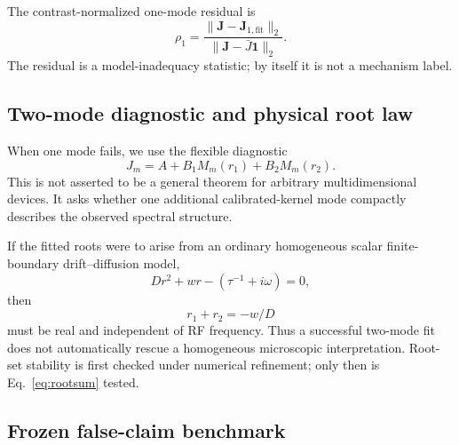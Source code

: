 \documentclass[11pt]{article}
\begin{document}
The contrast-normalized one-mode residual is
\begin{equation}
\rho_1=\frac{\|\bm J-\bm J_{1,\mathrm{fit}}\|_2}{\|\bm J-\bar J\bm 1\|_2}.
\label{eq:rho1}
\end{equation}
The residual is a model-inadequacy statistic; by itself it is not a mechanism label.

\subsection{Two-mode diagnostic and physical root law}

When one mode fails, we use the flexible diagnostic
\begin{equation}
J_m=A+B_1M_m(r_1)+B_2M_m(r_2).
\label{eq:twomode}
\end{equation}
This is not asserted to be a general theorem for arbitrary multidimensional devices. It asks whether one additional calibrated-kernel mode compactly describes the observed spectral structure.

If the fitted roots were to arise from an ordinary homogeneous scalar finite-boundary drift--diffusion model,
\begin{equation}
D r^2+w r-(\tau^{-1}+i\omega)=0,
\label{eq:quadratic}
\end{equation}
then
\begin{equation}
\boxed{r_1+r_2=-w/D}
\label{eq:rootsum}
\end{equation}
must be real and independent of RF frequency. Thus a successful two-mode fit does not automatically rescue a homogeneous microscopic interpretation. Root-set stability is first checked under numerical refinement; only then is Eq.~\eqref{eq:rootsum} tested.

\subsection{Frozen false-claim benchmark}
\end{document}
